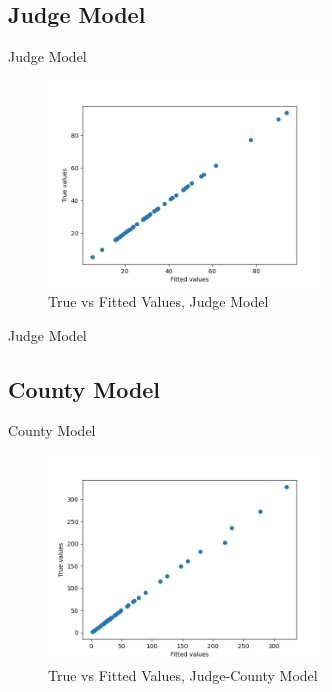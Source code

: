 \documentclass[11pt, oneside]{article}   	%
\theoremstyle{ModifiedStyle}
\begin{document}
		  \subsection{Judge Model}

		    \begin{table}[H]
		      \centering
		      \caption{Judge Model}
		      
		    \end{table}

		    \begin{figure}[H]
		      \centering
		      \includegraphics[width=0.65\textwidth]{../../output/figures/Exploration/fit_utilization_JudgeID}
		      \caption{True vs Fitted Values, Judge Model}
		    \end{figure}

		    \begin{table}[H]
		      \centering
		      \caption{Judge Model}
		      
		    \end{table}

		  \subsection{County Model}

		    \begin{table}[H]
		      \centering
		      \caption{County Model}
		      
		    \end{table}

		    \begin{figure}[H]
		      \centering
		      \includegraphics[width=0.65\textwidth]{../../output/figures/Exploration/fit_min_County}
		      \caption{True vs Fitted Values, Judge-County Model}
		    \end{figure}
\end{document}
